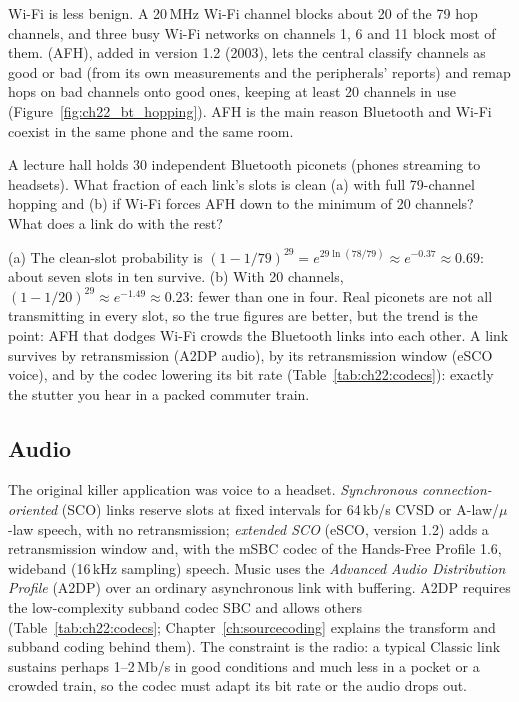 
Wi-Fi is less benign. A 20\,MHz Wi-Fi channel blocks about 20 of the 79 hop channels, and three busy
Wi-Fi networks on channels 1, 6 and 11 block most of them.  (AFH),
added in version 1.2 (2003), lets the central classify channels as good or bad (from its own
measurements and the peripherals' reports) and remap hops on bad channels onto good ones, keeping at
least 20 channels in use (Figure~\ref{fig:ch22_bt_hopping}). AFH is the main reason Bluetooth and
Wi-Fi coexist in the same phone and the same room.

\begin{worked}
A lecture hall holds 30 independent Bluetooth piconets (phones streaming to headsets). What fraction
of each link's slots is clean (a) with full 79-channel hopping and (b) if Wi-Fi forces AFH down to
the minimum of 20 channels? What does a link do with the rest?

(a) The clean-slot probability is $(1-1/79)^{29}=e^{29\ln(78/79)}\approx e^{-0.37}\approx0.69$: about
seven slots in ten survive. (b) With 20 channels, $(1-1/20)^{29}\approx e^{-1.49}\approx0.23$: fewer
than one in four. Real piconets are not all transmitting in every slot, so the true figures are
better, but the trend is the point: AFH that dodges Wi-Fi crowds the Bluetooth links into each
other. A link survives by retransmission (A2DP audio), by its retransmission window (eSCO voice), and
by the codec lowering its bit rate (Table~\ref{tab:ch22:codecs}): exactly the stutter you hear in a
packed commuter train.
\end{worked}

\subsection{Audio}

The original killer application was voice to a headset. \emph{Synchronous connection-oriented} (SCO)
links reserve slots at fixed intervals for 64\,kb/s CVSD or A-law/$\mu$-law speech, with no
retransmission; \emph{extended SCO} (eSCO, version 1.2) adds a retransmission window and, with the
mSBC codec of the Hands-Free Profile 1.6, wideband (16\,kHz sampling) speech. Music uses the
\emph{Advanced Audio Distribution Profile} (A2DP) over an ordinary asynchronous link with buffering.
A2DP requires the low-complexity subband codec SBC and allows others (Table~\ref{tab:ch22:codecs};
Chapter~\ref{ch:sourcecoding} explains the transform and subband coding behind them). The constraint
is the radio: a typical Classic link sustains perhaps 1--2\,Mb/s in good conditions and much less in a
pocket or a crowded train, so the codec must adapt its bit rate or the audio drops out.


